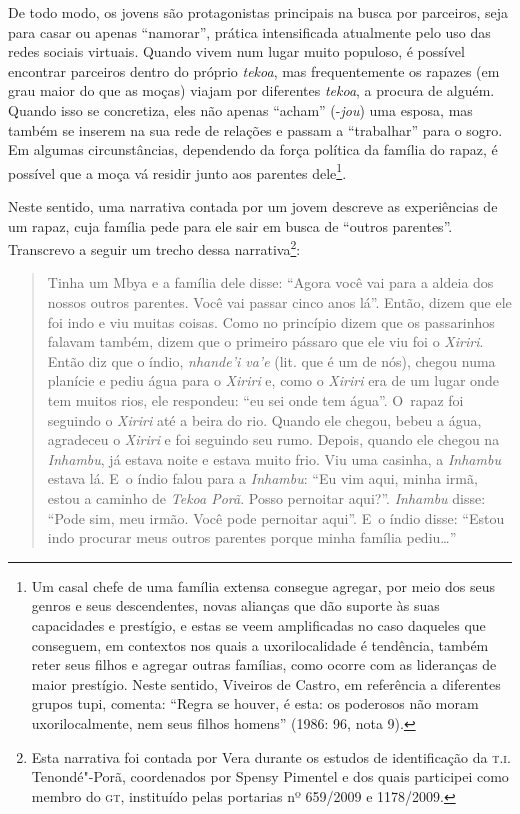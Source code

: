 De todo modo, os jovens são protagonistas principais na busca por
parceiros, seja para casar ou apenas ``namorar'', prática intensificada
atualmente pelo uso das redes sociais virtuais. Quando vivem num lugar
muito populoso, é possível encontrar parceiros dentro do próprio \emph{tekoa},
mas frequentemente os rapazes (em grau maior do que as moças) viajam
por diferentes \emph{tekoa}, a procura de alguém. Quando isso se concretiza,
eles não apenas ``acham'' (-\emph{jou}) uma esposa, mas também se inserem na sua
rede de relações e passam a ``trabalhar'' para o sogro. Em algumas
circunstâncias, dependendo da força política da família do rapaz, é
possível que a moça vá residir junto aos parentes dele\footnote[15]{Um
casal chefe de uma família extensa consegue agregar, por meio dos seus
genros e seus descendentes, novas alianças que dão suporte às suas
capacidades e prestígio, e estas se veem amplificadas no caso daqueles
que conseguem, em contextos nos quais a uxorilocalidade é tendência,
também reter seus filhos e agregar outras famílias, como ocorre com as
lideranças de maior prestígio. Neste sentido, Viveiros de Castro, em
referência a diferentes grupos tupi, comenta: ``Regra se houver, é esta:
os poderosos não moram uxorilocalmente, nem seus filhos homens'' (1986:
96, nota 9).}. 

Neste sentido, uma narrativa contada por um jovem descreve as
experiências de um rapaz, cuja família pede para ele sair em busca de
``outros parentes''. Transcrevo a seguir um trecho dessa
narrativa\footnote[16]{Esta narrativa foi contada por Vera durante os
estudos de identificação da \textsc{t}.\textsc{i}. Tenondé"-Porã, coordenados por Spensy
Pimentel e dos quais participei como membro do \textsc{gt}, instituído pelas
portarias nº 659/2009 e 1178/2009.}: 

\begin{quote}
\noindent
Tinha um Mbya e a família dele disse: ``Agora você vai para a aldeia dos
nossos outros parentes. Você vai passar cinco anos lá''. Então, dizem
que ele foi indo e viu muitas coisas. Como no princípio dizem que os
passarinhos falavam também, dizem que o primeiro pássaro que ele viu
foi o \emph{Xiriri}. Então diz que o índio, \emph{nhande’i va’e} (lit. que é um de
nós), chegou numa planície e pediu água para o \emph{Xiriri} e, como o \emph{Xiriri}
era de um lugar onde tem muitos rios, ele respondeu: ``eu sei onde tem
água''. O~rapaz foi seguindo o \emph{Xiriri} até a beira do rio. Quando ele
chegou, bebeu a água, agradeceu o \emph{Xiriri} e foi seguindo seu rumo.
Depois, quando ele chegou na \emph{Inhambu}, já estava noite e estava muito
frio. Viu uma casinha, a \emph{Inhambu} estava lá. E~o índio falou para a
\emph{Inhambu}: ``Eu vim aqui, minha irmã, estou a caminho de \emph{Tekoa Porã}. Posso
pernoitar aqui?''. \emph{Inhambu} disse: ``Pode sim, meu irmão. Você pode
pernoitar aqui''. E~o índio disse: ``Estou indo procurar meus outros
parentes porque minha família pediu\ldots'' 
\end{quote}

